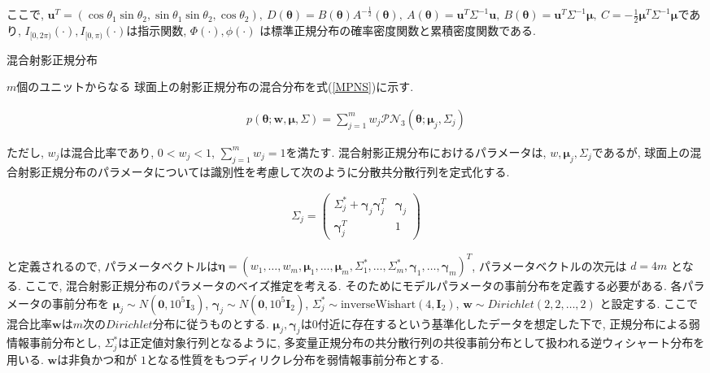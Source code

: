 \documentclass[a4j,11pt]{jarticle}
\makeatletter
\def\subsection{\@startsection{subsection}{1}{\z@}
   {0.8\Cvs \@plus.5\Cdp \@minus.2\Cdp}
   {0.2\Cvs \@plus.3\Cdp}
   {\normalfont \normalsize \bfseries}}
\makeatother
\begin{document}
\noindent
ここで, $\bm u^T = (\cos\theta_1 \sin \theta_2, \sin\theta_1 \sin \theta_2, \cos \theta_2), 
\ D(\bm \theta) = B(\bm \theta) A^{-\frac{1}{2}}(\bm \theta), \ A(\bm \theta) = \bm u^T \Sigma^{-1} \bm u, \ B(\bm \theta) = \bm u^T \Sigma^{-1} \bm \mu, \ C = -\frac{1}{2} \bm \mu^T \Sigma^{-1} \bm \mu$であり, $I_{[0,2\pi)} (\cdot), I_{[0,\pi)}(\cdot)$は指示関数, $\Phi(\cdot), \phi(\cdot)$ は標準正規分布の確率密度関数と累積密度関数である.

\vspace{-1zh}
\subsection{混合射影正規分布}

$m$個のユニットからなる 球面上の射影正規分布の混合分布を式(\ref{MPNS})に示す. 

\vspace{-2zh}
\begin{eqnarray}
\label{MPNS}
p(\bm \theta;\bm w,\bm \mu, \Sigma) = \sum^m_{j=1} w_j \mathcal{PN}_3(\bm \theta;\bm \mu_j, \Sigma_j) 
\end{eqnarray}

\vspace{-1zh}
\noindent
ただし, $w_j$は混合比率であり, $0 < w_j < 1$, $\sum^m_{j=1} w_j = 1$を満たす. 混合射影正規分布におけるパラメータは, $w, \bm \mu_j, \Sigma_j$であるが, 球面上の混合射影正規分布のパラメータについては識別性を考慮して次のように分散共分散行列を定式化する. 

\vspace{-2zh}
\begin{eqnarray}
\label{SIGMA}
 \Sigma_j = \left(
    \begin{array}{cc}
      \Sigma^*_j + \bm \gamma_j \bm \gamma_j^T & \bm \gamma_j \\
      \bm \gamma_j^T & 1
    \end{array}
  \right)
\end{eqnarray}

\vspace{-0.5zh}
\noindent
と定義されるので, パラメータベクトルは$\bm \eta = (w_1, \dots, w_m, \bm \mu_1, \dots, \bm \mu_m, \Sigma^*_1, \dots, \Sigma^*_m, \bm \gamma_1, \dots, \bm \gamma_m)^T$, パラメータベクトルの次元は $d = 4m$ となる. ここで, 混合射影正規分布のパラメータのベイズ推定を考える. そのためにモデルパラメータの事前分布を定義する必要がある. 各パラメータの事前分布を $\bm \mu_j \sim N(\bm 0, 10^5 \bm I_3)$, $\bm \gamma_j \sim  N(\bm 0, 10^5 \bm I_2)$, $\Sigma^*_j \sim \mathrm{inverse Wishart}(4,\bm I_2)$, $\bm w \sim Dirichlet(2,2, \dots, 2)$ と設定する. ここで混合比率$\bm w$は$m$次の$Dirichlet$分布に従うものとする. $\bm \mu_j, \bm \gamma_j$は$0$付近に存在するという基準化したデータを想定した下で, 正規分布による弱情報事前分布とし, $\Sigma^*_j$は正定値対象行列となるように, 多変量正規分布の共分散行列の共役事前分布として扱われる逆ウィシャート分布を用いる. $\bm w$は非負かつ和が $1$となる性質をもつディリクレ分布を弱情報事前分布とする.
\end{document}
